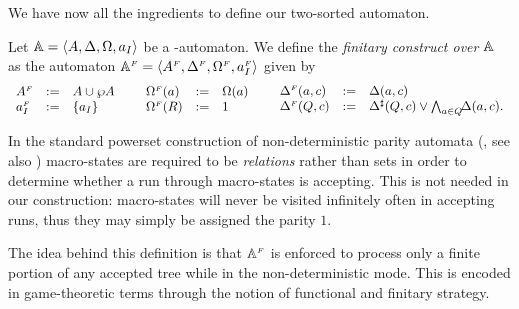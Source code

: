 We have now all the ingredients to define our two-sorted automaton.

\begin{definition}\label{def:finitaryconstruct}
Let $\mathbb{A} = \langle{A,\Delta,\Omega,a_I}\rangle$ be a {\wmso-automaton}.
We define the \emph{finitary construct over $\mathbb{A}$} as the automaton
$\mathbb{A}^{{\scriptscriptstyle F}} = \langle{A^{{\scriptscriptstyle F}},\Delta^{{\scriptscriptstyle F}},\Omega^{{\scriptscriptstyle F}},a_I^{{\scriptscriptstyle F}}}\rangle$ given by
\[
\begin{array}{lll}
   A^{\fin}   &\df&  A \cup \shA
\\ a_I^{\fin} &\df&  \{a_I\}
\end{array}
%
\hspace*{5mm}
%
\begin{array}{lll}
   \pmap^{\fin}(a) &\df& \pmap(a)
\\ \pmap^{\fin}(R) &\df& 1
\end{array}
%
\hspace*{5mm}
%
\begin{array}{lll}
   \tmap^{\fin}(a,c) &\df& \tmap(a,c)
\\ \tmap^{\fin}(Q,c) &\df&
  \shDe(Q,c) \vee \bigwedge_{a \in Q} \! \! \tmap(a,c).
\end{array}
\]
\end{definition}

\begin{remark} 
In the standard powerset construction of non-deterministic parity 
automata (\cite{Walukiewicz96}, see also \cite{Ven08,ArnoldN01})
macro-states are required to be \emph{relations} rather than sets in order to
determine whether a run through macro-states is accepting. 
This is not needed in our construction: macro-states will never be visited
infinitely often in accepting runs, thus they may simply be assigned the parity
$1$.
\end{remark}

The idea behind this definition is that $\mathbb{A}^{{\scriptscriptstyle F}}$ is enforced to process only a finite portion of any accepted tree while in the non-deterministic mode. This is encoded in game-theoretic terms through the notion of functional and finitary strategy.

